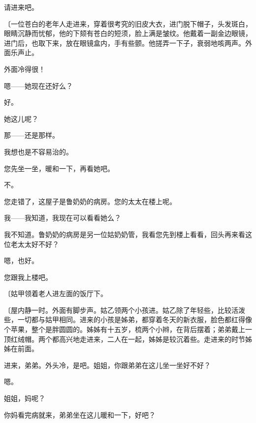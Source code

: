 请进来吧。

{\fangsong〔一位苍白的老年人走进来，穿着很考究的旧皮大衣，进门脱下帽子，头发斑白，眼睛沉静而忧郁，他的下颏有苍白的短须，脸上满是皱纹。他戴着一副金边眼镜，进门后，也取下来，放在眼镜盒内，手有些颤。他搓弄一下子，衰弱地咳两声。外面乐声止。}

外面冷得很！

嗯——她现在还好么？

好。

她这儿呢？

那——还是那样。

我想也是不容易治的。

您先坐一坐，暖和一下，再看她吧。

不。

您走错了，这屋子是鲁奶奶的病房。您的太太在楼上呢。

我——我知道，我现在可以看看她么？

我不知道。鲁奶奶的病房是另一位姑奶奶管，我看您先到楼上看看，回头再来看这位老太太好不好？

嗯，也好。

您跟我上楼吧。

{\fangsong〔姑甲领着老人进左面的饭厅下。}

{\fangsong〔屋内静一时。外面有脚步声。姑乙领两个小孩进。姑乙除了年轻些，比较活泼些，一切都与姑甲相同。进来的小孩是姊弟，都穿着冬天的新衣服，脸色都红得像个苹果，整个是胖圆圆的。姊姊有十五岁，梳两个小辫，在背后摆着；弟弟戴上一顶红绒帽。两个都高兴地走进来，二人在一起，姊姊是较沉着些。走进来的时节姊姊在前面。}

进来，弟弟。外头冷，是吧。姐姐，你跟弟弟在这儿坐一坐好不好？

嗯。

姐姐，妈呢？

你妈看完病就来，弟弟坐在这儿暖和一下，好吧？

